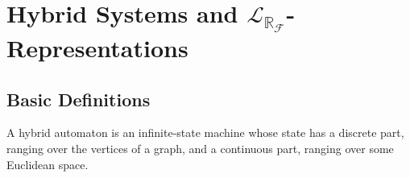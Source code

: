 \documentclass[envcountsect]{llncs}
\newcommand{\lrf}{\mathcal{L}_{\mathbb{R}_{\mathcal{F}}}}
\begin{document}
\begin{theorem}
\end{theorem}


\begin{theorem}[Complexity]
\end{theorem}


\section{Hybrid Systems and $\lrf$-Representations}

\subsection{Basic Definitions}

A hybrid automaton is an infinite-state machine whose state has a discrete part, ranging over the vertices of a graph, and a continuous part, ranging over some Euclidean space. 
\end{document}
